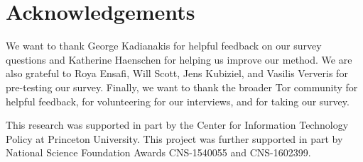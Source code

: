 \section*{Acknowledgements}
We want to thank George Kadianakis for helpful feedback on our survey questions
and Katherine Haenschen for helping us improve our method.  We are also grateful
to Roya Ensafi, Will Scott, Jens Kubiziel, and Vasilis Ververis for pre-testing
our survey.  Finally, we want to thank the broader Tor community for helpful
feedback, for volunteering for our interviews, and for taking our survey.

This research was supported in part by the Center for Information Technology
Policy at Princeton University.  This project was further supported in part by
National Science Foundation Awards CNS-1540055 and CNS-1602399.

